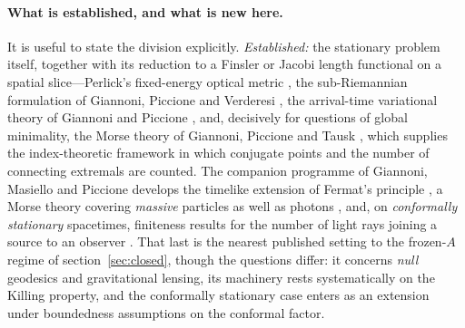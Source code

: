 \documentclass[12pt]{iopart}
\theoremstyle{plain}
\theoremstyle{definition}
\theoremstyle{remark}
\begin{document}
\paragraph{What is established, and what is new here.} It is useful to state the division
explicitly. \emph{Established:} the stationary problem itself, together with its reduction
to a Finsler or Jacobi length functional on a spatial slice---Perlick's fixed-energy
optical metric \cite{Perlick1991}, the sub-Riemannian formulation of Giannoni, Piccione and
Verderesi \cite{GiannoniPiccioneVerderesi1997}, the arrival-time variational theory of
Giannoni and Piccione \cite{GiannoniPiccione2002}, and, decisively for questions of global
minimality, the Morse theory of Giannoni, Piccione and Tausk
\cite{GiannoniPiccioneTausk2002}, which supplies the index-theoretic framework in which
conjugate points and the number of connecting extremals are counted. The companion
programme of Giannoni, Masiello and Piccione develops the timelike extension of Fermat's
principle \cite{GiannoniMasielloPiccione1998}, a Morse theory covering \emph{massive}
particles as well as photons \cite{GiannoniMasielloPiccione2000}, and, on
\emph{conformally stationary} spacetimes, finiteness results for the number of
light rays joining a source to an observer \cite{GiannoniMasielloPiccione2001}.
That last is the nearest published setting to the frozen-$A$ regime of
section~\ref{sec:closed}, though the questions differ: it concerns \emph{null}
geodesics and gravitational lensing, its machinery rests systematically on the
Killing property, and the conformally stationary case enters as an extension
under boundedness assumptions on the conformal factor.
\end{document}
